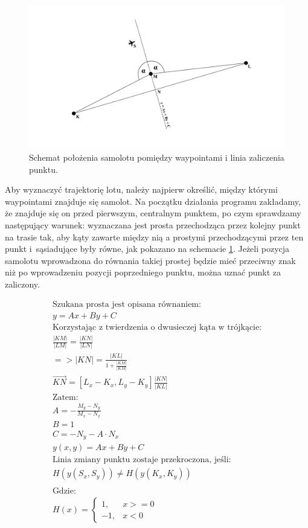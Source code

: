 \documentclass[12pt, a4paper]{article}
\begin{document}
 \begin{figure}[ht]
    \centering
    \includegraphics[width=1\textwidth]{nextwaypoint}
    \caption{Schemat położenia samolotu pomiędzy waypointami i linia zaliczenia punktu.}
    \label{fig:wp}
\end{figure}

Aby wyznaczyć trajektorię lotu, należy najpierw określić, między którymi waypointami znajduje się samolot. Na początku działania programu zakładamy, że znajduje się on przed pierwszym, centralnym punktem, po czym sprawdzamy następujący warunek: wyznaczana jest prosta przechodząca przez kolejny punkt na trasie tak, aby kąty zawarte między nią a prostymi przechodzącymi przez ten punkt i~sąsiadujące były równe, jak pokazano na schemacie \ref{fig:wp}. Jeżeli pozycja samolotu wprowadzona do równania takiej prostej będzie mieć przeciwny znak niż po wprowadzeniu pozycji poprzedniego punktu, można uznać punkt za zaliczony. 


\begin{gather*}
	\text{Szukana prosta jest opisana równaniem:} \\ 
	y = Ax + By + C \\ 
	\text{Korzystając z twierdzenia o dwusieczej kąta w trójkącie:} \\	
	\frac{|KM|}{|LM|} = \frac{|KN|}{|LN|} \\
	=>|KN| = \frac{|KL|}{1+\frac{|KM|}{|KM|}} \\
	\vec{KN} = [L_x - K_x, L_y - K_y] \frac{|KN|}{|KL|} \\
	\text{Zatem:} \\
	A = -\frac{M_y - N_y}{M_x - N_x} \\
	B = 1 \\
	C = -N_y - A \cdot N_x \\
	y(x, y) = Ax + By + C  \\
	\text{Linia zmiany punktu zostaje przekroczona, jeśli:} \\
	H(y(S_x, S_y)) \neq  H(y(K_x, K_y)) \\
	\\
	\text{Gdzie:} \\
	H(x) = \begin{cases} 1, & x >= 0 \\ -1, & x < 0 \end{cases} \\ 
\end{gather*}
\end{document}
